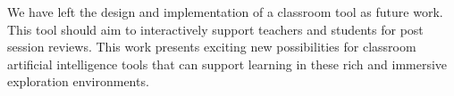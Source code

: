 We have left the design and implementation of a classroom tool as future work. This tool should aim to interactively support teachers and students for post session reviews. This work presents exciting new possibilities for classroom artificial intelligence tools that can support learning in these rich and immersive exploration environments.
